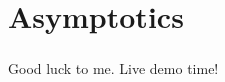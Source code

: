 
\section{Asymptotics}
\begin{frame}\frametitle{\insertsubsection}

Good luck to me. Live demo time!

\end{frame}

